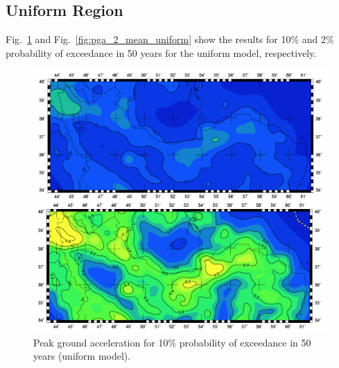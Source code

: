 \subsection{Uniform Region}
Fig.~\ref{fig:pga_10_mean_uniform} and Fig.~\ref{fig:pga_2_mean_uniform} show the results for 10\% and 2\% probability of exceedance in 50 years for the uniform model, respectively.



\begin{figure} [!ht]
\centering
\includegraphics[scale=0.3]{figures/pdf/pga_10_mean_uniform.pdf} 
\caption{Peak ground acceleration for 10\% probability of exceedance in 50 years (uniform model).}
\label{fig:pga_10_mean_uniform}
\end{figure}

